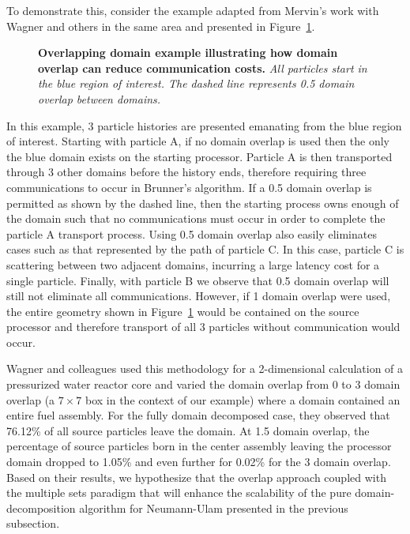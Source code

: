 \documentclass[letterpaper,11pt]{article}
\begin{document}
To demonstrate this, consider the example adapted from Mervin's work
with Wagner and others in the same area \cite{mervin_variance_2012}
and presented in Figure~\ref{fig:msod_example}.
\begin{figure}[t!]
  \begin{center}
    \scalebox{1.5}{
       }
  \end{center}
  \caption{\textbf{Overlapping domain example illustrating how domain
      overlap can reduce communication costs.}
    \textit{All particles start in the blue region of interest. The
      dashed line represents 0.5 domain overlap between domains.}}
  \label{fig:msod_example}
\end{figure}
In this example, 3 particle histories are presented emanating from the
blue region of interest. Starting with particle A, if no domain
overlap is used then the only the blue domain exists on the starting
processor. Particle A is then transported through 3 other domains
before the history ends, therefore requiring three communications to
occur in Brunner's algorithm. If a 0.5 domain overlap is permitted as
shown by the dashed line, then the starting process owns enough of the
domain such that no communications must occur in order to complete the
particle A transport process. Using 0.5 domain overlap also easily
eliminates cases such as that represented by the path of particle
C. In this case, particle C is scattering between two adjacent
domains, incurring a large latency cost for a single
particle. Finally, with particle B we observe that 0.5 domain overlap
will still not eliminate all communications. However, if 1 domain
overlap were used, the entire geometry shown in
Figure~\ref{fig:msod_example} would be contained on the source
processor and therefore transport of all 3 particles without
communication would occur.

Wagner and colleagues used this methodology for a 2-dimensional
calculation of a pressurized water reactor core and varied the domain
overlap from 0 to 3 domain overlap (a $7 \times 7$ box in the context
of our example) where a domain contained an entire fuel assembly. For
the fully domain decomposed case, they observed that 76.12\% of all
source particles leave the domain. At 1.5 domain overlap, the
percentage of source particles born in the center assembly leaving the
processor domain dropped to 1.05\% and even further for 0.02\% for the
3 domain overlap. Based on their results, we hypothesize that the
overlap approach coupled with the multiple sets paradigm that will
enhance the scalability of the pure domain-decomposition algorithm for
Neumann-Ulam presented in the previous subsection.
\end{document}
